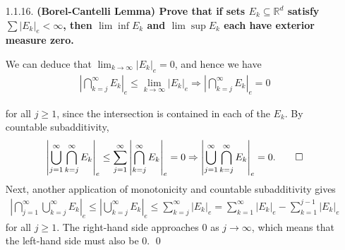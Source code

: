 \documentclass[a4paper,12pt]{article}
\begin{document}
\begin{enumerate}
    \item[1.1.16.]
        \boldmath\textbf{(Borel-Cantelli Lemma) Prove that if sets $E_k \subseteq \mathbb{R}^d$ satisfy $\sum|E_k|_e < \infty$, then $\lim\inf E_k$ and $\lim\sup E_k$ each have exterior measure zero.
        }\unboldmath \par
        We can deduce that $\lim_{k \to \infty} |E_k|_e = 0$, and hence we have
        \begin{align*}
            \left| \bigcap_{k = j}^\infty E_k \right|_e \leq \lim_{k \to \infty} |E_k|_e \Rightarrow \left| \bigcap_{k = j}^\infty E_k \right|_e = 0
        \end{align*} \par
        for all $j \geq 1$, since the intersection is contained in each of the $E_k$. By countable subadditivity,
        \begin{align*}
            \left| \bigcup_{j = 1}^\infty \bigcap_{k = j}^\infty E_k \right|_e \leq \sum_{j = 1}^\infty \left| \bigcap_{k = j}^\infty E_k \right|_e = 0 \Rightarrow \left| \bigcup_{j = 1}^\infty \bigcap_{k = j}^\infty E_k \right|_e = 0. \qed
        \end{align*}
        Next, another application of monotonicity and countable subadditivity gives
        \begin{align*}
            \left| \bigcap_{j = 1}^\infty \bigcup_{k = j}^\infty E_k \right|_e \leq \left| \bigcup_{k = j}^\infty E_k \right|_e \leq \sum_{k = j}^\infty \left| E_k \right|_e = \sum_{k = 1}^\infty \left| E_k \right|_e - \sum_{k = 1}^{j - 1} \left| E_k \right|_e
        \end{align*}
        for all $j \geq 1$. The right-hand side approaches $0$ as $j \to \infty$, which means that the left-hand side must also be $0$. \qed


\end{enumerate}
\end{document}
